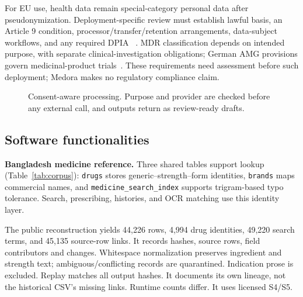 \documentclass[preprint,12pt,a4paper]{elsarticle}
\begin{document}
For EU use, health data remain special-category personal data after pseudonymization.
Deployment-specific review must establish lawful basis, an Article 9 condition,
processor/transfer/retention arrangements, data-subject workflows, and any required DPIA
~\cite{gdpr}. MDR classification depends on intended purpose, with separate clinical-investigation
obligations; German AMG provisions govern medicinal-product trials~\cite{mdr,amg}.
These requirements need assessment before such deployment; Medora makes no regulatory
compliance claim.

\begin{figure}[!htbp]
\centering\resizebox{\textwidth}{!}{}
\caption{Consent-aware processing. Purpose and provider are checked before any external
call, and outputs return as review-ready drafts.}
\label{fig:consent}
\end{figure}

\subsection{Software functionalities}

\textbf{Bangladesh medicine reference.} Three shared tables support lookup
(Table~\ref{tab:corpus}): \texttt{drugs} stores generic--strength--form identities,
\texttt{brands} maps commercial names, and \texttt{medicine\_search\_index} supports
trigram-based typo tolerance. Search, prescribing, histories, and OCR matching use this
identity layer.

The public reconstruction yields 44,226 rows, 4,994 drug identities, 49,220 search terms, and
45,135 source-row links. It records hashes, source rows, field contributors and changes.
Whitespace normalization preserves ingredient and strength text; ambiguous/conflicting
records are quarantined. Indication prose is excluded. Replay matches all output hashes.
It documents its own lineage, not the historical CSV's missing links.
Runtime counts differ. It uses licensed S4/S5.
\end{document}
